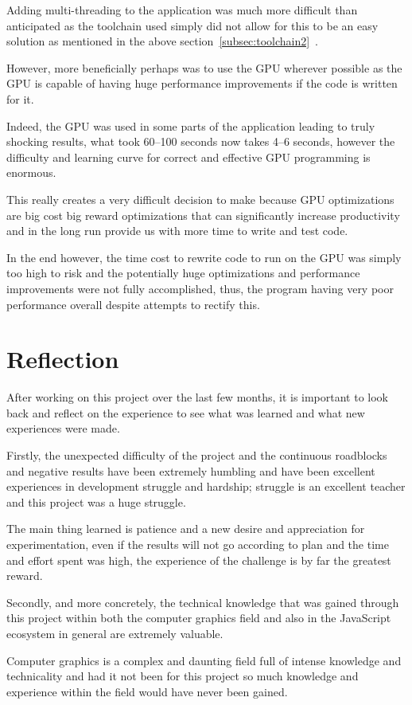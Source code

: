 \documentclass[12pt]{article}
\newcommand{\sentence}{} %
\newcommand{\fullref}[1]{\ref{#1}~\nameref{#1}}
\begin{document}
    \bigskip
    \sentence
    Adding multi-threading to the application was much more difficult than anticipated as the toolchain used simply
    did not allow for this to be an easy solution as mentioned in the above section~\fullref{subsec:toolchain2}.
    \sentence
    However, more beneficially perhaps was to use the GPU wherever possible as the GPU is capable of having huge
    performance improvements if the code is written for it.
    \sentence
    Indeed, the GPU was used in some parts of the application leading to truly shocking results, what took 60--100
    seconds now takes 4--6 seconds, however the difficulty and learning curve for correct and effective GPU
    programming is enormous.
    \sentence
    This really creates a very difficult decision to make because GPU optimizations are big cost big reward
    optimizations that can significantly increase productivity and in the long run provide us with more time to write
    and test code.
    \sentence
    In the end however, the time cost to rewrite code to run on the GPU was simply too high to risk and the
    potentially huge optimizations and performance improvements were not fully accomplished, thus, the program having
    very poor performance overall despite attempts to rectify this.

    \pagebreak


    \section{Reflection}\label{sec:reflection}

    \tab
    After working on this project over the last few months, it is important to look back and reflect on the
    experience to see what was learned and what new experiences were made.
    \sentence
    Firstly, the unexpected difficulty of the project and the continuous roadblocks and negative results have been
    extremely humbling and have been excellent experiences in development struggle and hardship;
    struggle is an excellent teacher and this project was a huge struggle.
    \sentence
    The main thing learned is patience and a new desire and appreciation for experimentation, even if the results
    will not go according to plan and the time and effort spent was high, the experience of the challenge is by far
    the greatest reward.
    \sentence
    Secondly, and more concretely, the technical knowledge that was gained through this project within both the
    computer graphics field and also in the JavaScript ecosystem in general are extremely valuable.
    \sentence
    Computer graphics is a complex and daunting field full of intense knowledge and technicality and had it not been
    for this project so much knowledge and experience within the field would have never been gained.
\end{document}

